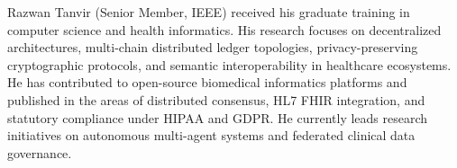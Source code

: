 \documentclass[lettersize,journal]{IEEEtran}
\theoremstyle{definition}
\begin{document}
\begin{IEEEbiographynophoto}{Razwan Tanvir}
(Senior Member, IEEE) received his graduate training in computer science and health informatics. His research focuses on decentralized architectures, multi-chain distributed ledger topologies, privacy-preserving cryptographic protocols, and semantic interoperability in healthcare ecosystems. He has contributed to open-source biomedical informatics platforms and published in the areas of distributed consensus, HL7 FHIR integration, and statutory compliance under HIPAA and GDPR. He currently leads research initiatives on autonomous multi-agent systems and federated clinical data governance.
\end{IEEEbiographynophoto}

\vfill
\end{document}
